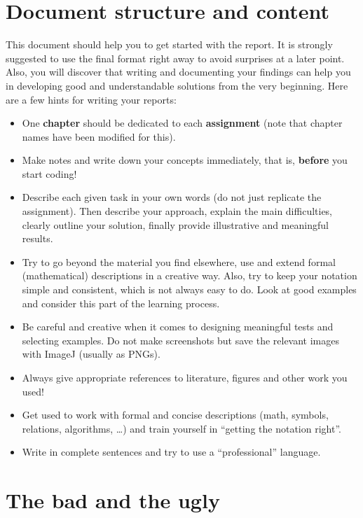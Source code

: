 \documentclass[notitlepage,english]{hgbreport}
\begin{document}
\section*{Document structure and content}

This document should help you to get started with the report.
It is strongly suggested to use the final format right away to avoid
surprises at a later point. Also, you will discover that writing and documenting your findings  
can help you in developing good and understandable solutions from the very beginning.
Here are a few hints for writing your reports:
%
\begin{itemize}
\item
One \textbf{chapter} should be dedicated to each \textbf{assignment} (note that chapter names have been modified for this).
\item
Make notes and write down your concepts immediately, that is, \textbf{before} you start coding!
\item
Describe each given task in your own words (do not just replicate the assignment). 
Then describe your approach, explain the main difficulties, clearly outline your solution, finally 
provide illustrative and meaningful results. 
\item
Try to go beyond the material you find elsewhere, use and extend formal (mathematical) descriptions in a creative way. 
Also, try to keep your notation simple and consistent, which is not always easy to do. Look at good examples 
and consider this part of the learning process.
\item
Be careful and creative when it comes to designing meaningful tests and selecting examples.
Do not make screenshots but save the relevant images with ImageJ (usually as PNGs).
\item
Always give appropriate references to literature, figures and other work you used!
\item
Get used to work with formal and concise descriptions (math, symbols, relations, algorithms, \ldots) and train yourself in 
``getting the notation right''. 
\item 
Write in complete sentences and try to use a ``professional'' language.
\end{itemize}


\section*{The bad and the ugly}
\end{document}
